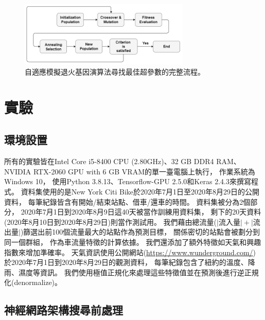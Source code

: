 \documentclass[a4paper,14pt]{extarticle}
\begin{document}
            \begin{figure}[!htb]
                \centering
                \includegraphics[width=0.725\textwidth]{SAGA_scheme.png}
                \caption{
                    {\fontsize{12pt}{10pt}\selectfont
                        自適應模擬退火基因演算法尋找最佳超參數的完整流程。
                    }
                }
                \label{fig:SAGA_scheme}
            \end{figure}
            

    \newpage

    \section{實驗}
        \subsection{環境設置}
            
            所有的實驗皆在Intel Core i5-8400 CPU (2.80GHz)、32 GB DDR4 RAM、NVIDIA RTX-2060 GPU with 6 GB VRAM的單一臺電腦上執行，
            作業系統為Windows 10，
            使用Python 3.8.13、Tensorflow-GPU 2.5.0和Keras 2.4.3來撰寫程式。
            資料集使用的是New York Citi Bike於2020年7月1日至2020年8月29日的公開資料，
            每筆紀錄皆含有開始/結束站點、借車/還車的時間。
            資料集被分為2個部分，
            2020年7月1日到2020年8月9日這40天被當作訓練用資料集，
            剩下的20天資料(2020年8月10日到2020年8月29日)則當作測試用。
            我們藉由總流量($\lvert$流入量$\rvert + \lvert$流出量$\rvert$)篩選出前100個流量最大的站點作為預測目標，
            關係密切的站點會被劃分到同一個群組，
            作為車流量特徵的計算依據。
            我們還添加了額外特徵如天氣和興趣指數來增加準確率。
            天氣資訊使用公開網站(\url{https://www.wunderground.com/})
            於2020年7月1日到2020年8月29日的觀測資料，
            每筆紀錄包含了紐約的溫度、降雨、濕度等資訊。
            我們使用極值正規化來處理這些特徵值並在預測後進行逆正規化(denormalize)。

        \subsection{神經網路架構搜尋前處理}
\end{document}
